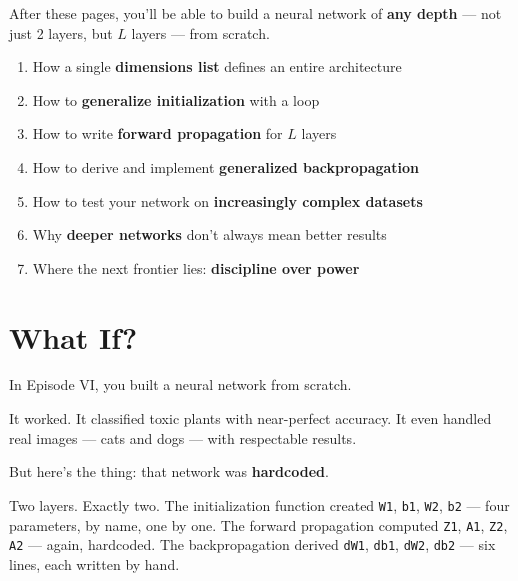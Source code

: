 \documentclass[11pt]{article}
\begin{document}
\tableofcontents

\vspace{1.5em}

\begin{defbox}[title=What You'll Learn in This Episode]
After these pages, you'll be able to build a neural network of \textbf{any depth} --- not just 2 layers, but $L$ layers --- from scratch.

\begin{enumerate}[label=\textbf{\arabic*.}]
  \item How a single \textbf{dimensions list} defines an entire architecture
  \item How to \textbf{generalize initialization} with a loop
  \item How to write \textbf{forward propagation} for $L$ layers
  \item How to derive and implement \textbf{generalized backpropagation}
  \item How to test your network on \textbf{increasingly complex datasets}
  \item Why \textbf{deeper networks} don't always mean better results
  \item Where the next frontier lies: \textbf{discipline over power}
\end{enumerate}
\end{defbox}

\newpage

\section{What If?}

In Episode VI, you built a neural network from scratch.

It worked. It classified toxic plants with near-perfect accuracy. It even handled real images --- cats and dogs --- with respectable results.

But here's the thing: that network was \textbf{hardcoded}.

Two layers. Exactly two. The initialization function created \texttt{W1}, \texttt{b1}, \texttt{W2}, \texttt{b2} --- four parameters, by name, one by one. The forward propagation computed \texttt{Z1}, \texttt{A1}, \texttt{Z2}, \texttt{A2} --- again, hardcoded. The backpropagation derived \texttt{dW1}, \texttt{db1}, \texttt{dW2}, \texttt{db2} --- six lines, each written by hand.
\end{document}
